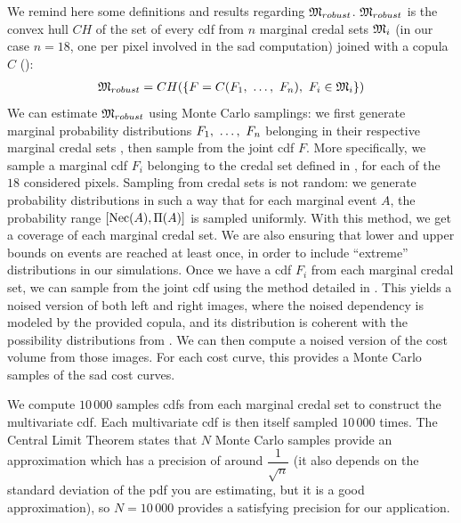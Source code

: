 We remind here some definitions and results regarding $\mathfrak{M}_{robust}$. $\mathfrak{M}_{robust}$ is the convex hull $CH$ of the set of every \acrshort{cdf} from $n$ marginal credal sets $\mathfrak{M}_i$ (in our case $n=18$, one per pixel involved in the \acrshort{sad} computation) joined with a copula $C$ ():
\begin{align*}
    \mathfrak{M}_{robust} = CH(\{F=C(F_1 , ~\ldots, ~ F_n),~F_i\in\mathfrak{M}_i \})
\end{align*}
We can estimate $\mathfrak{M}_{robust}$ using Monte Carlo samplings: we first generate marginal probability distributions $F_1, ~\ldots, ~ F_n$ belonging in their respective marginal credal sets \cite{troffaes_note_2017}, then sample from the joint \acrshort{cdf} $F$. More specifically, we sample a marginal \acrshort{cdf} $F_i$ belonging to the credal set defined in , for each of the $18$ considered pixels. Sampling from credal sets is not random: we generate probability distributions in such a way that for each marginal event $A$, the probability range $[\mathrm{Nec}(A), \Pi(A)]$ is sampled uniformly. With this method, we get a coverage of each marginal credal set. We are also ensuring that lower and upper bounds on events are reached at least once, in order to include ``extreme'' distributions in our simulations. Once we have a \acrshort{cdf} $F_i$ from each marginal credal set, we can sample from the joint \acrshort{cdf} using the method detailed in . This yields a noised version of both left and right images, where the noised dependency is modeled by the provided copula, and its distribution is coherent with the possibility distributions from . We can then compute a noised version of the cost volume from those images. For each cost curve, this provides a Monte Carlo samples of the \acrshort{sad} cost curves.

We compute $10\,000$ samples \acrshort{cdf}s from each marginal credal set to construct the multivariate \acrshort{cdf}. Each multivariate \acrshort{cdf} is then itself sampled $10\,000$ times. The Central Limit Theorem states that $N$ Monte Carlo samples provide an approximation which has a precision of around $\dfrac{1}{\sqrt{n}}$ (it also depends on the standard deviation of the \acrshort{pdf} you are estimating, but it is a good approximation), so $N=10\,000$ provides a satisfying precision for our application.  


